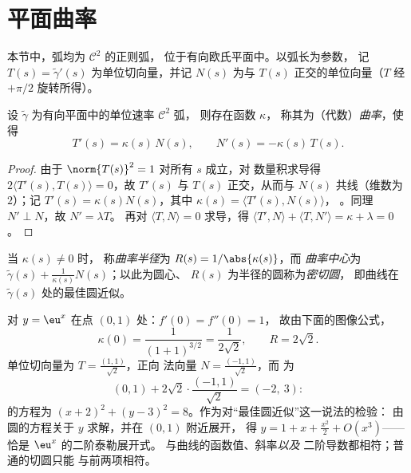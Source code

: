 \section{平面曲率}

本节中，弧均为 $\mathcal{C}^2$ 的正则弧，
位于有向欧氏平面中。以弧长为参数，
记 $T(s) = \tilde\gamma'(s)$ 为单位切向量，并记 $N(s)$
为与 $T(s)$ 正交的单位向量（$T$ 经
$+\pi/2$ 旋转所得）。

\begin{theorem}[平面弗雷内公式]\label{thm:b2:curves:frenet2d}
设 $\tilde\gamma$ 为有向平面中的单位速率 $\mathcal{C}^2$ 弧，
则存在函数 $\kappa$，
称其为（代数）\emph{曲率}，使得
\[
T'(s) = \kappa(s)\, N(s),
\qquad
N'(s) = -\kappa(s)\, T(s).
\]
\end{theorem}

\begin{proof}
由于 $\norm{T(s)}^2 = 1$ 对所有 $s$ 成立，对
数量积求导得 $2\langle T'(s), T(s)\rangle = 0$，故 $T'(s)$ 与
$T(s)$ 正交，从而与 $N(s)$ 共线（维数为 $2$）；记 $T'(s)
= \kappa(s) N(s)$，其中 $\kappa(s) = \langle T'(s), N(s)\rangle$，
。同理 $N' \perp N$，故 $N' = \lambda T$。
再对 $\langle T, N\rangle = 0$ 求导，得 $\langle T', N\rangle +
\langle T, N'\rangle = \kappa + \lambda = 0$。
\end{proof}

\begin{definition}\label{def:b2:curves:curvature}
当 $\kappa(s) \neq 0$ 时，
称\emph{曲率半径}为 $R(s) =
1/\abs{\kappa(s)}$，而
\emph{曲率中心}为
$\tilde\gamma(s) + \frac{1}{\kappa(s)} N(s)$；以此为圆心、
$R(s)$ 为半径的圆称为\emph{密切圆}，
即曲线在 $\tilde\gamma(s)$ 处的最佳圆近似。
\end{definition}

\begin{example}\label{ex:b2:curves:oscexp}
对 $y = \eu^x$ 在点 $(0, 1)$ 处：$f'(0) = f''(0) = 1$，
故由下面的图像公式，
\[
\kappa(0) = \frac{1}{(1 + 1)^{3/2}} = \frac1{2\sqrt2},
\qquad R = 2\sqrt2 .
\]
单位切向量为 $T = \frac{(1, 1)}{\sqrt2}$，正向
法向量 $N = \frac{(-1, 1)}{\sqrt2}$，而
为
\[
(0, 1) + 2\sqrt2\cdot\frac{(-1, 1)}{\sqrt2} = (-2,\ 3) :
\]
的方程为 $(x + 2)^2 + (y - 3)^2 =
8$。作为对“最佳圆近似”这一说法的检验：
由圆的方程关于 $y$ 求解，并在 $(0,1)$ 附近展开，
得 $y = 1 + x + \frac{x^2}2 + O(x^3)$——
恰是 $\eu^x$ 的二阶泰勒展开式。
与曲线的函数值、斜率\emph{以及}
二阶导数都相符；普通的切圆只能
与前两项相符。
\end{example}

